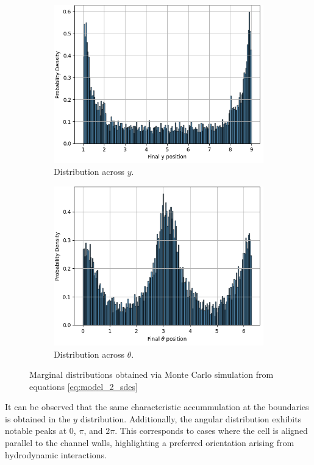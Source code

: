 \begin{figure}[htbp]
    \centering
    \begin{subfigure}[b]{0.45\textwidth}
        \centering
        \includegraphics[width=\textwidth]{graphics/model_2_y_dist.png}
        \caption{Distribution across $y$.}
        \label{fig:model_2_y_hist}
    \end{subfigure}
    \hfill
    \begin{subfigure}[b]{0.45\textwidth}
        \centering
        \includegraphics[width=\textwidth]{graphics/model_2_theta_dist.png}
        \caption{Distribution across $\theta$.}
        \label{fig:model_2_theta_hist}
    \end{subfigure}
    \caption{Marginal distributions obtained via 
    Monte Carlo simulation from equations \eqref{eq:model_2_sdes}}
    \label{fig:model_2_results}
\end{figure}

It can be observed that the same characteristic accummulation at the boundaries is obtained in the
$y$ distribution. Additionally, the angular distribution
exhibits notable peaks at $0$, $\pi$, and $2\pi$. This corresponds to cases where the cell is 
aligned parallel to the channel walls, highlighting a preferred orientation arising from hydrodynamic
interactions.







